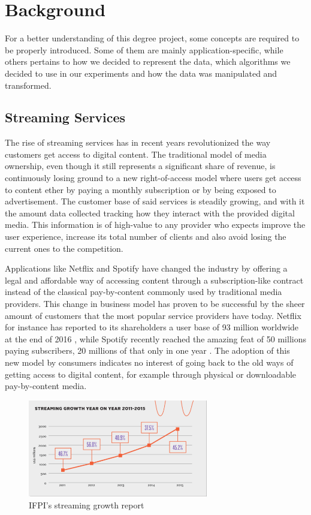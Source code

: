\documentclass{kththesis}
\begin{document}
\chapter{Background}
\label{cha:background}

For a better understanding of this degree project, some concepts are required to be properly introduced. Some of them are mainly application-specific, while others pertains to how we decided to represent the data, which algorithms we decided to use in our experiments and how the data was manipulated and transformed. 

	\section{Streaming Services}
	
	The rise of streaming services has in recent years revolutionized the way customers get access to digital content. The traditional model of media ownership, even though it still represents a significant share of revenue, is continuously losing ground to a new right-of-access model where users get access to content ether by paying a monthly subscription or by being exposed to advertisement. The customer base of said services is steadily growing, and with it the amount data collected tracking how they interact with the provided digital media. This information is of high-value to any provider who expects improve the user experience, increase its total number of clients and also avoid losing the current ones to the competition.

	Applications like Netflix and Spotify have changed the industry by offering a legal and affordable way of accessing content through a subscription-like contract instead of the classical pay-by-content commonly used by traditional media providers. This change in business model has proven to be successful by the sheer amount of customers that the most popular service providers have today. Netflix for instance has reported to its shareholders a user base of 93 million worldwide at the end of 2016 \citep{netflixsh}, while Spotify recently reached the amazing feat of 50 millions paying subscribers, 20 millions of that only in one year \citep{spotifypress}. The adoption of this new model by consumers indicates no interest of going back to the old ways of getting access to digital content, for example through physical or downloadable pay-by-content media.

	\begin{figure}[h]
    \centering
    \includegraphics[width=0.7\textwidth, natwidth=580bp, natheight=313bp]{figures/ifpi_stream_growth.png}
    \caption{IFPI's streaming growth report}
    \label{fig:ifpi-growth-report}
\end{figure}
\end{document}
